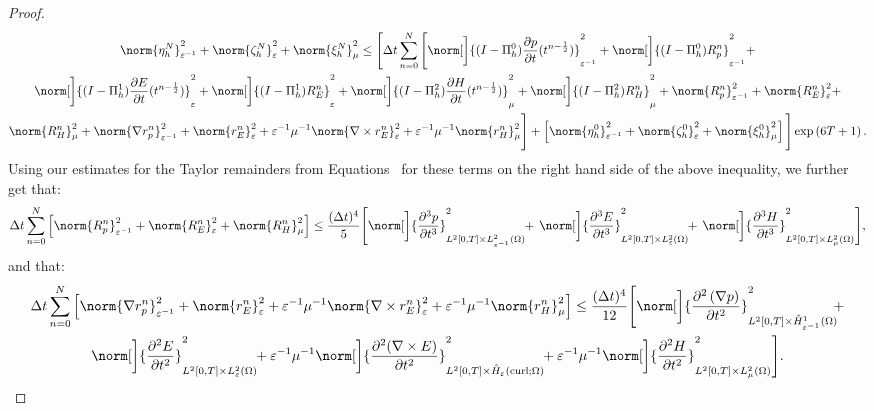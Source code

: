 \documentclass{amsart}
\theoremstyle{thmstyleone}%
\theoremstyle{thmstyletwo}%
\theoremstyle{thmstylethree}%
\DeclareMathOperator{\curl}{curl}
\begin{document}
\begin{proof}
\begin{multline*}
  \norm{\eta_h^N}^2_{\varepsilon^{-1}} + \norm{\zeta_h^N}^2_{\varepsilon} + \norm{\xi_h^N}^2_{\mu} \le \Bigg[\Delta t \sum\limits_{n = 0}^{N} \Bigg[ \norm[\bigg]{(I - \Pi_h^0) \dfrac{\partial p}{\partial t}(t^{n - \frac{1}{2}})}^2_{\varepsilon^{-1}} + \norm[\bigg]{(I - \Pi_h^0) R_p^n}^2_{\varepsilon^{-1}} + \\
  \norm[\bigg]{(I - \Pi_h^1) \dfrac{\partial E}{\partial t}(t^{n - \frac{1}{2}})}^2_{\varepsilon} + \norm[\bigg]{(I - \Pi_h^1) R_E^n}^2_{\varepsilon} + \norm[\bigg]{(I - \Pi_h^2) \dfrac{\partial H}{\partial t}(t^{n - \frac{1}{2}})}^2_\mu + \norm[\bigg]{(I - \Pi_h^2) R_H^n}^2_\mu + \norm{R_p^n}^2_{\varepsilon^{-1}} + \norm{R_E^n}^2_{\varepsilon} + \\
 \norm{R_H^n}^2_{\mu} + \norm{\nabla r_p^n} ^2_{\varepsilon^{-1}} + \norm{r_E^n}^2_{\varepsilon} + \varepsilon^{-1} \mu^{-1} \norm{\nabla \times r_E^n}^2_{\varepsilon} +  \varepsilon^{-1} \mu^{-1} \norm{r_H^n}^2_{\mu}\Bigg] + \left[ \norm{\eta_h^0}^2_{\varepsilon^{-1}} + \norm{\zeta_h^0}^2_{\varepsilon} + \norm{\xi_h^0}^2_{\mu} \right] \Bigg] \exp\left( 6 T + 1 \right).
\end{multline*}
Using our estimates for the Taylor remainders from Equations~ for these terms on the right hand side of the above inequality, we further get that:
\[
  \Delta t \sum\limits_{n = 0}^N \Big[ \norm{R^n_p}^2_{\varepsilon^{-1}} + \norm{R^n_E}^2_{\varepsilon} + \norm{R^n_H}^2_\mu \Big] \le \dfrac{(\Delta t)^4}{5} \Bigg[ \norm[\bigg]{\dfrac{\partial^3 p}{\partial t^3}}^2_{L^2[0, T] \times L^2_{\varepsilon^{-1}}(\Omega)} \!\! + \, \norm[\bigg]{\dfrac{\partial^3 E}{\partial t^3}}^2_{L^2[0, T] \times L^2_\varepsilon(\Omega)} \!\! + \, \norm[\bigg]{\dfrac{\partial^3 H}{\partial t^3}}^2_{L^2[0, T] \times L^2_\mu(\Omega)} \Bigg],
\]
and that:
\begin{multline*}
  \Delta t \sum\limits_{n = 0}^N \Big[ \norm{\nabla r^n_p}^2_{\varepsilon^{-1}} + \norm{r^n_E}^2_{\varepsilon} + \varepsilon^{-1} \mu^{-1} \norm{\nabla \times r^n_E}^2_{\varepsilon} +  \varepsilon^{-1} \mu^{-1} \norm{r^n_H}^2_\mu \Big] \le \dfrac{(\Delta t)^4}{12} \Bigg[ \norm[\bigg]{\dfrac{\partial^2 \left(\nabla p \right)}{\partial t^2}}^2_{L^2[0, T] \times \mathring{H}^1_{\varepsilon^{-1}}(\Omega)} \!\! + \\ 
  \norm[\bigg]{\dfrac{\partial^2 E}{\partial t^2}}^2_{L^2[0, T] \times L^2_\varepsilon(\Omega)} \!\! + \varepsilon^{-1} \mu^{-1} \norm[\bigg]{\dfrac{\partial^2 (\nabla \times E)}{\partial t^2}}^2_{L^2[0, T] \times \mathring{H}_\varepsilon(\curl; \Omega)} \!\! + \varepsilon^{-1} \mu^{-1} \norm[\bigg]{\dfrac{\partial^2 H}{\partial t^2}}^2_{L^2[0, T] \times L^2_\mu(\Omega)} \Bigg].

\end{multline*}
\end{proof}
\end{document}
